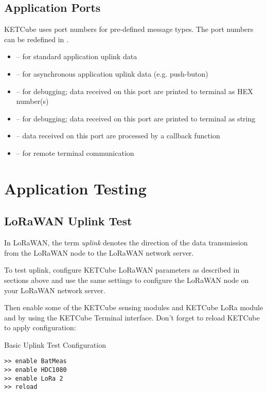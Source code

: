 \subsection*{Application Ports} 
KETCube uses port numbers for pre-defined message types. The port numbers can be redefined in .
\begin{itemize}
  \item {} -- for standard application uplink data
  \item {} -- for asynchronous application uplink data (e.g. push-buton)
  \item {} -- for debugging; data received on this port are printed to terminal as HEX number(s)
  \item {} -- for debugging; data received on this port are printed to terminal as string
  \item {} -- data received on this port are processed by a callback function 
  \item {} -- for remote terminal communication
\end{itemize}


\clearpage
\section{Application Testing}
\subsection{LoRaWAN Uplink Test}
In LoRaWAN, the term {\it uplink} denotes the direction of the data transmission from the LoRaWAN node to the LoRaWAN network server.

To test uplink, configure KETCube LoRaWAN parameters as described in sections above and use the same settings to configure the LoRaWAN node on your LoRaWAN network server.

Then enable some of the KETCube sensing modules and KETCube LoRa module and by using the KETCube Terminal interface. Don't forget to reload KETCube to apply configuration:

\begin{docCodeExampleTitled}{Basic Uplink Test Configuration}
\begin{verbatim}
>> enable BatMeas
>> enable HDC1080
>> enable LoRa 2
>> reload
\end{verbatim}
\end{docCodeExampleTitled}

